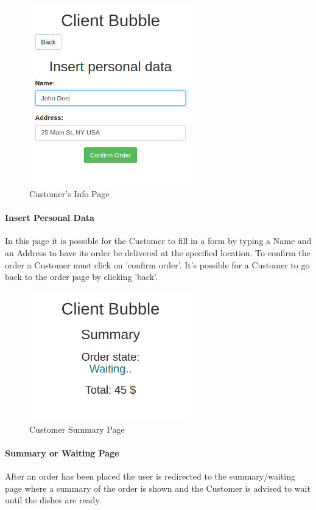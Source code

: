 \begin{figure}[H]
	\centering
	\includegraphics[width=7cm]{../../documenti/UserManualDemo/demo_screens/client_info.png}
	\caption{Customer's Info Page}
\end{figure}
\paragraph{Insert Personal Data}
In this page it is possible for the Customer to fill in a form by typing a Name and an Address to have its order be delivered at the specified location. To confirm the order a Customer must click on 'confirm order'. 
It's possible for a Customer to go back to the order page by clicking 'back'.

\begin{figure}[H]
	\centering
	\includegraphics[width=7cm]{../../documenti/UserManualDemo/demo_screens/client_summary.png}
	\caption{Customer Summary Page}
\end{figure}
\paragraph{Summary or Waiting Page}
After an order has been placed the user is redirected to the summary/waiting page where a summary of the order is shown and the Customer is advised to wait until the dishes are ready.

